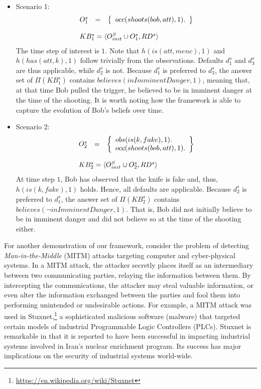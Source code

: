 \documentclass{article}
\begin{document}
\begin{itemize}
\item Scenario 1: \[
\begin{array}{lll}
O^s_{1} & = & \left\{
\begin{array}{l} 
occ(shoots(bob,att),1). 
\end{array}
\right\}\\
\ \\
\multicolumn{3}{l}{KB^s_1=\langle O^S_{init} \cup O^s_1,RD^s \rangle}
\end{array}
\]
The time step of interest is $1$. Note that $h(is(att,menc),1)$ and $h(has(att,k),1)$ follow trivially from the observations. Defaults $d^s_1$ and $d^s_3$ are thus applicable, while $d^{s}_2$ is not.  Because $d^s_1$ is preferred to $d^s_3$, the answer set of $\Pi(KB^s_1)$ contains $believes(inImminentDanger, 1)$, meaning that, at that time Bob pulled the trigger, he believed to be in imminent danger at the time of the shooting. It is worth noting how the framework is able to capture the evolution of Bob's beliefs over time.  
\item Scenario 2: \[
\begin{array}{lll}
O^s_{2} & = & \left\{
\begin{array}{l} 
obs(is(k,fake),1). \\   %
occ(shoots(bob,att),1).
\end{array}
\right\} \\
\ \\
\multicolumn{3}{l}{KB^s_2=\langle O^S_{init} \cup O^s_2,RD^s \rangle}
\end{array}
\]
At time step $1$, Bob has observed that the knife is fake and, thus, $h(is(k,fake),1)$ holds. Hence, all defaults are applicable.  Because $d^s_2$ is preferred to $d^s_1$, the answer set of $\Pi(KB^s_2)$ contains $believes(\neg inImminentDanger, 1)$. That is, Bob did not initially believe to be in imminent danger and did not believe so at the time of the shooting either. 
\end{itemize}


For another demonstration of our framework, consider the problem of detecting \emph{Man-in-the-Middle} (MITM) attacks targeting computer and cyber-physical systems.  In a MITM attack, the attacker secretly places itself as an intermediary between two communicating parties, relaying the information between them. By intercepting the communications, the attacker may steal valuable information, or even alter the information exchanged between the parties and fool them into performing unintended or undesirable actions. 
For example, a MITM attack was used in Stuxnet,\footnote{\tiny \url{https://en.wikipedia.org/wiki/Stuxnet}} a sophisticated malicious software (malware) that targeted certain models of industrial Programmable Logic Controllers (PLCs). Stuxnet is remarkable in that it is reported to have been successful in impacting industrial systems involved in Iran's nuclear enrichment program. Its success has major implications on the security  of industrial systems world-wide.
\end{document}
